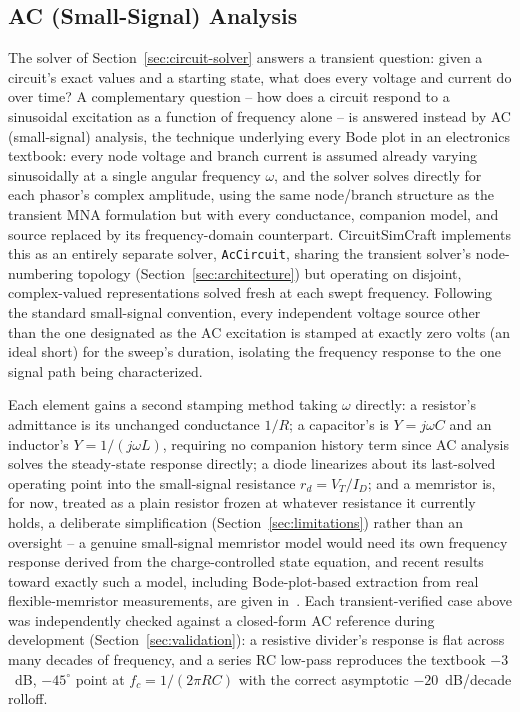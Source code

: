 \subsection{AC (Small-Signal) Analysis}
\label{sec:ac-analysis}

The solver of Section~\ref{sec:circuit-solver} answers a transient question: given a
circuit's exact values and a starting state, what does every voltage and current do over
time? A complementary question -- how does a circuit respond to a sinusoidal excitation as a
function of frequency alone -- is answered instead by AC (small-signal) analysis, the
technique underlying every Bode plot in an electronics textbook: every node voltage and
branch current is assumed already varying sinusoidally at a single angular frequency
$\omega$, and the solver solves directly for each phasor's complex amplitude, using the same
node/branch structure as the transient MNA formulation but with every conductance,
companion model, and source replaced by its frequency-domain counterpart. CircuitSimCraft
implements this as an entirely separate solver, \texttt{AcCircuit}, sharing the transient
solver's node-numbering topology (Section~\ref{sec:architecture}) but operating on disjoint,
complex-valued representations solved fresh at each swept frequency. Following the standard
small-signal convention, every independent voltage source other than the one designated as
the AC excitation is stamped at exactly zero volts (an ideal short) for the sweep's duration,
isolating the frequency response to the one signal path being characterized.

Each element gains a second stamping method taking $\omega$ directly: a resistor's admittance
is its unchanged conductance $1/R$; a capacitor's is $Y=j\omega C$ and an inductor's
$Y=1/(j\omega L)$, requiring no companion history term since AC analysis solves the
steady-state response directly; a diode linearizes about its last-solved operating point into
the small-signal resistance $r_d=V_T/I_D$; and a memristor is, for now, treated as a plain
resistor frozen at whatever resistance it currently holds, a deliberate simplification
(Section~\ref{sec:limitations}) rather than an oversight -- a genuine small-signal memristor
model would need its own frequency response derived from the charge-controlled state
equation, and recent results toward exactly such a model, including Bode-plot-based
extraction from real flexible-memristor measurements, are given
in~\cite{gater2026smallsignal,gater2025bodeplots}. Each transient-verified case above was
independently checked against a closed-form AC reference during development
(Section~\ref{sec:validation}): a resistive divider's response is flat across many decades of
frequency, and a series RC low-pass reproduces the textbook $-3$~dB, $-45^\circ$ point at
$f_c=1/(2\pi RC)$ with the correct asymptotic $-20$~dB/decade rolloff.

